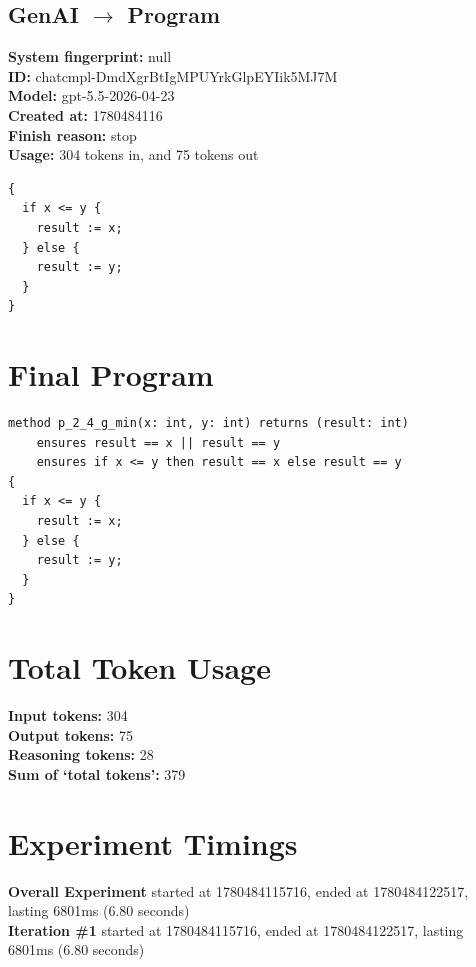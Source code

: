 \documentclass{article}
\begin{document}
\subsection*{GenAI $\rightarrow$ Program}
\textbf{System fingerprint: }null
\\\textbf{ID: }chatcmpl-DmdXgrBtIgMPUYrkGlpEYIik5MJ7M
\\\textbf{Model: }gpt-5.5-2026-04-23
\\\textbf{Created at: }1780484116
\\\textbf{Finish reason: }stop
\\\textbf{Usage: }304 tokens in, and 75 tokens out
\begin{lstlisting}
{
  if x <= y {
    result := x;
  } else {
    result := y;
  }
}
\end{lstlisting}
\section*{Final Program}
\begin{lstlisting}
method p_2_4_g_min(x: int, y: int) returns (result: int)
	ensures result == x || result == y
	ensures if x <= y then result == x else result == y
{
  if x <= y {
    result := x;
  } else {
    result := y;
  }
}
\end{lstlisting}
\section*{Total Token Usage}
\textbf{Input tokens: }304
\\\textbf{Output tokens: }75
\\\textbf{Reasoning tokens: }28
\\\textbf{Sum of `total tokens': }379
\section*{Experiment Timings}
\textbf{Overall Experiment} started at 1780484115716, ended at 1780484122517, lasting 6801ms (6.80 seconds)
\\\textbf{Iteration \#1} started at 1780484115716, ended at 1780484122517, lasting 6801ms (6.80 seconds)
\end{document}
